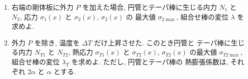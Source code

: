 \begin{enumerate}[label=(\arabic*)]
  \item 右端の剛体板に外力 $P$ を加えた場合, 円管とテーパ棒に生じる内力
        $N_1$ と $N_2$, 応力 $\sigma_1(x)$ と $\sigma_2(x)$, $\sigma_2(x)$ の
        最大値 $\sigma_{2\max}$, 組合せ棒の変位 $\lambda$ を求めよ.

  \item 外力 $P$ を除き, 温度を $\Delta T$ だけ上昇させた. このとき円管と
        テーパ棒に生じる内力 $N_{T1}$ と $N_{T2}$, 熱応力 $\sigma_{T1}(x)$ と
        $\sigma_{T2}(x)$, $\sigma_{T2}(x)$ の最大値 $\sigma_{T2\max}$,
        組合せ棒の変位 $\lambda_T$ を求めよ. ただし, 円管とテーパ棒の
        熱膨張係数は, それぞれ $2\alpha$ と $\alpha$ とする.
\end{enumerate}
